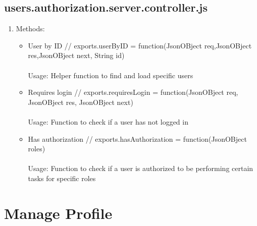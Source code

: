 \documentclass[a4paper,12pt]{article}
\begin{document}
\subsection{users.authorization.server.controller.js}
\begin{enumerate}
\item Methods: 
	\begin{itemize}
		\item User by ID // exports.userByID = function(JsonOBject req,JsonOBject res,JsonOBject next, String id)
		\\ \\ Usage: Helper function to find and load specific users
		\item Requires login // exports.requiresLogin = function(JsonOBject req, JsonOBject res, JsonOBject next) 
		\\ \\ Usage: Function to check if a user has not logged in
		\item Has authorization // exports.hasAuthorization = function(JsonOBject roles)
		\\ \\ Usage: Function to check if a user is authorized to be performing certain tasks for specific roles
	\end{itemize}

\end{enumerate}


\section{Manage Profile} 
\end{document}
